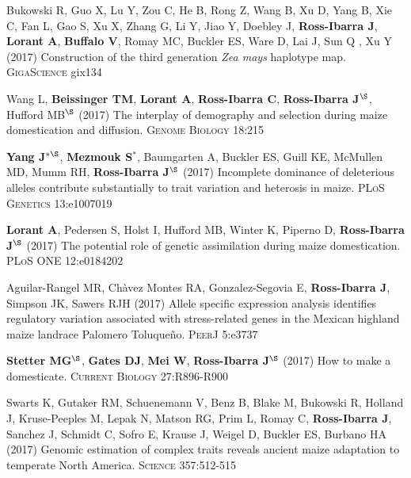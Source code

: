 \documentclass[letterpaper,10pt]{article}
\begin{document}
\begin{etaremune}
\item Bukowski R, Guo X, Lu Y, Zou C, He B, Rong Z, Wang B,  Xu D,  Yang B, Xie C,  Fan L, Gao S, Xu X, Zhang G, Li Y, Jiao Y, Doebley J, {\bf Ross-Ibarra J}, {\bf Lorant A}, {\bf Buffalo V}, Romay MC, Buckler ES, Ware D, Lai J, Sun Q , Xu Y (2017) Construction of the third generation \emph{Zea mays} haplotype map. \textsc{GigaScience} gix134

\item Wang L, \textbf{Beissinger TM}, \textbf{Lorant A}, \textbf{Ross-Ibarra C}, \textbf{Ross-Ibarra J}$^\S$, Hufford MB$^\S$ (2017) The interplay of demography and selection during maize domestication and diffusion. \textsc{Genome Biology} 18:215

\item {\bf Yang J}$^{*\S}$, {\bf Mezmouk S}$^*$, Baumgarten A, Buckler ES, Guill KE, McMullen MD, Mumm RH, {\bf Ross-Ibarra J}$^\S$ (2017) Incomplete dominance of deleterious alleles contribute substantially to trait variation and heterosis in maize. \textsc{PLoS Genetics} 13:e1007019

\item \textbf{Lorant A}, Pedersen S, Holst I, Hufford MB, Winter K, Piperno D, \textbf{Ross-Ibarra J}$^\S$ (2017) The potential role of genetic assimilation during maize domestication. \textsc{PLoS ONE} 12:e0184202

\item Aguilar-Rangel MR, Ch\`{a}vez Montes RA,  Gonzalez-Segovia E, \textbf{Ross-Ibarra J}, Simpson JK, Sawers RJH (2017) Allele specific expression analysis identifies regulatory variation associated with stress-related genes in the Mexican highland maize landrace Palomero Toluque\~{n}o. \textsc{PeerJ} 5:e3737

\item   {\bf Stetter MG}$^\S$, {\bf Gates DJ}, {\bf Mei W}, {\bf Ross-Ibarra J}$^\S$ (2017) How to make a domesticate. \textsc{Current Biology} 27:R896-R900

\item Swarts K, Gutaker RM,   Schuenemann V,  Benz B,  Blake M, Bukowski R, Holland J, Kruse-Peeples M, Lepak N, Matson RG, Prim L, Romay C, {\bf Ross-Ibarra J}, Sanchez J, Schmidt C,  Sofro E,  Krause J,  Weigel D,  Buckler ES,  Burbano HA (2017) Genomic estimation of complex traits reveals ancient maize adaptation to temperate North America. \textsc{Science} 357:512-515


\end{etaremune}
\end{document}
